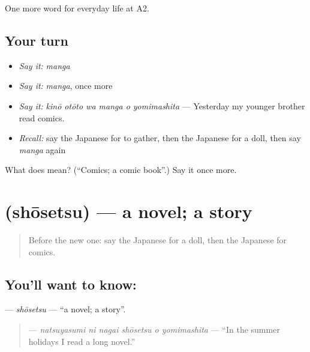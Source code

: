 \begin{grammarlens}[title={What you've built}]
One more word for everyday life at A2.
\end{grammarlens}

\subsection*{Your turn}
\begin{itemize}
\raggedright
  \item \emph{Say it:} \emph{manga}
  \item \emph{Say it:} \emph{manga}, once more
  \item \emph{Say it:} \emph{kinō otōto wa manga o yomimashita} — Yesterday my younger brother read comics.
  \item \emph{Recall:} say the Japanese for to gather, then the Japanese for a doll, then say \emph{manga} again
\end{itemize}

\begin{tcolorbox}[breakable,colback=teal!4,colframe=teal!35!black,title={Before you move on}]
What does  mean? (\textquotedblleft{}Comics; a comic book\textquotedblright{}.) Say it once more.
\end{tcolorbox}
\section[\texorpdfstring{\ja{しょうせつ} (shōsetsu)}{しょうせつ (shōsetsu)}]{ (shōsetsu) — a novel; a story}

\label{lesson:JA-C238-shousetsu}



\begin{quote}
Before the new one: say the Japanese for a doll, then the Japanese for comics.
\end{quote}

\subsection*{You'll want to know: }
\textbf{} — \emph{shōsetsu} — \textquotedblleft{}a novel; a story\textquotedblright{}.

\begin{quote}
\textbf{   } — \emph{natsuyasumi ni nagai shōsetsu o yomimashita} — \textquotedblleft{}In the summer holidays I read a long novel.\textquotedblright{}
\end{quote}

